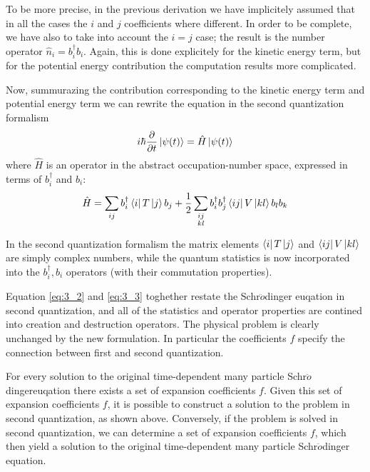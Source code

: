 \documentclass[../main/main.tex]{subfiles}
\begin{document}

To be more precise, in the previous derivation we have implicitely assumed that in all the cases the \( i \)  and \( j \)  coefficients where different. In order to be complete, we have also to take into account the \( i = j \) case; the result is the number operator \( \hat{n}_i = b_i^\dag b_i \).
Again, this is done explicitely for the kinetic energy term, but for the potential energy contribution the computation results more complicated.

Now, summurazing the contribution corresponding to the kinetic energy term and potential energy term we can rewrite the equation in the second quantization formalism
\begin{equation}
  i \hbar \pdv{}{t} \ket{\psi (t)} = \hat{H} \ket{\psi (t)}
  \label{eq:3_2}
\end{equation}
where \( \hat{H}  \) is an operator in the abstract occupation-number space, expressed in terms of \( b_i^\dag \) and \( b_i \):
\begin{equation}
  \hat{H} = \sum_{ij}^{} b_i^\dag \bra{i}T \ket{j} b_j +
  \frac{1}{2} \sum_{\substack{ij \\ kl} }^{} b_i^\dag b_j^\dag \bra{ij} V \ket{kl} b_l b_k
  \label{eq:3_3}
\end{equation}
\begin{remark}
  In the second quantization formalism the matrix elements \( \bra{i}T \ket{j}   \) and \( \bra{ij}V \ket{kl}   \) are simply complex numbers, while the quantum statistics is now incorporated into the \( b_i^\dag,b_i \) operators (with their commutation properties).
\end{remark}
Equation \eqref{eq:3_2} and \eqref{eq:3_3} toghether restate the Schr$\ddot{o}$dinger euqation in second quantization, and all of the statistics and operator properties are contined into creation and destruction operators. The physical problem is clearly unchanged by the new formulation. In particular the coefficients \( f \) specify the connection between first and second quantization.

For every solution \cite{fetter} to the original time-dependent many particle Schr$\ddot{o}$dingereuqation there exists a set of expansion coefficients \( f \). Given this set of expansion coefficients \( f \), it is possible to construct a solution to the problem in second quantization, as shown above. Conversely, if the problem is solved in second quantization, we can determine a set of expansion coefficients \( f \), which then yield a solution to the original time-dependent many particle Schr$\ddot{o}$dinger equation.
\end{document}
